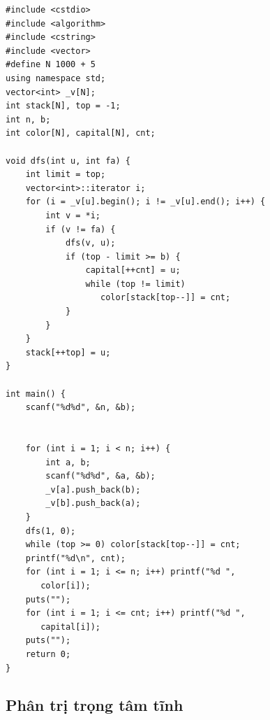 \documentclass[11pt]{article}
\begin{document}
\begingroup
\footnotesize
\begin{verbatim}
#include <cstdio>
#include <algorithm>
#include <cstring>
#include <vector>
#define N 1000 + 5
using namespace std;
vector<int> _v[N];
int stack[N], top = -1;
int n, b;
int color[N], capital[N], cnt;

void dfs(int u, int fa) {
    int limit = top;
    vector<int>::iterator i;
    for (i = _v[u].begin(); i != _v[u].end(); i++) {
        int v = *i;
        if (v != fa) {
            dfs(v, u);
            if (top - limit >= b) {
                capital[++cnt] = u;
                while (top != limit)
                   color[stack[top--]] = cnt;
            }
        }
    }
    stack[++top] = u;
}

int main() {
    scanf("%d%d", &n, &b);


    for (int i = 1; i < n; i++) {
        int a, b;
        scanf("%d%d", &a, &b);
        _v[a].push_back(b);
        _v[b].push_back(a);
    }
    dfs(1, 0);
    while (top >= 0) color[stack[top--]] = cnt;
    printf("%d\n", cnt);
    for (int i = 1; i <= n; i++) printf("%d ",
       color[i]);
    puts("");
    for (int i = 1; i <= cnt; i++) printf("%d ",
       capital[i]);
    puts("");
    return 0;
}
\end{verbatim}
\endgroup

\subsection{Phân trị trọng tâm tĩnh}
\end{document}
